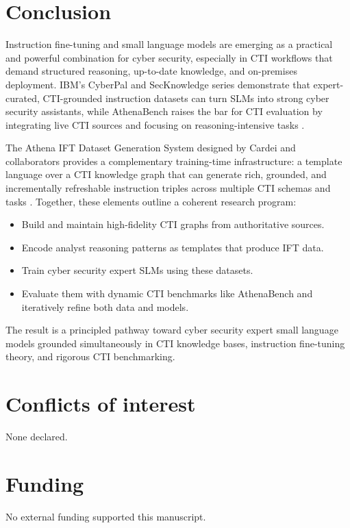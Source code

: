 \documentclass[unnumsec,webpdf,contemporary,large]{oup-authoring-template}
\theoremstyle{thmstyleone}
\theoremstyle{thmstyletwo}
\theoremstyle{thmstylethree}
\begin{document}
\section{Conclusion}

Instruction fine-tuning and small language models are emerging as a practical and powerful combination for cyber security, especially in CTI workflows that demand structured reasoning, up-to-date knowledge, and on-premises deployment. IBM's CyberPal and SecKnowledge series demonstrate that expert-curated, CTI-grounded instruction datasets can turn SLMs into strong cyber security assistants, while AthenaBench raises the bar for CTI evaluation by integrating live CTI sources and focusing on reasoning-intensive tasks \cite{levi2024cyberpal,levi2025toward,alam2025athenabench}.

The Athena IFT Dataset Generation System designed by Cardei and collaborators provides a complementary training-time infrastructure: a template language over a CTI knowledge graph that can generate rich, grounded, and incrementally refreshable instruction triples across multiple CTI schemas and tasks \cite{cardei2025ift}. Together, these elements outline a coherent research program:

\begin{itemize}
  \item Build and maintain high-fidelity CTI graphs from authoritative sources.
  \item Encode analyst reasoning patterns as templates that produce IFT data.
  \item Train cyber security expert SLMs using these datasets.
  \item Evaluate them with dynamic CTI benchmarks like AthenaBench and iteratively refine both data and models.
\end{itemize}

The result is a principled pathway toward cyber security expert small language models grounded simultaneously in CTI knowledge bases, instruction fine-tuning theory, and rigorous CTI benchmarking.


\section{Conflicts of interest}
None declared.

\section{Funding}
No external funding supported this manuscript.
\end{document}
